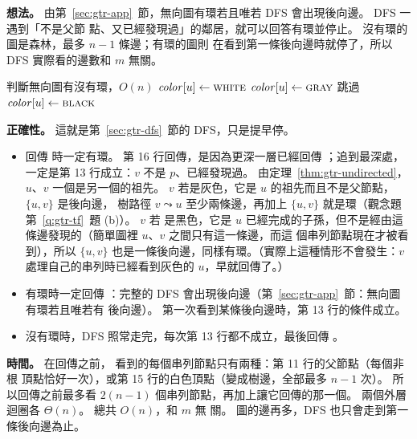 \textbf{想法。} 由第~\ref{sec:gtr-app}~節，無向圖有環若且唯若 DFS 會出現後向邊。 DFS 一遇到「不是父節
點、又已經發現過」的鄰居，就可以回答有環並停止。 沒有環的圖是森林，最多 $n - 1$ 條邊；有環的圖則
在看到第一條後向邊時就停了，所以 DFS 實際看的邊數和 $m$ 無關。

\begin{pseudo}[label=alg:gtr-px-ucycle]{判斷無向圖有沒有環，$O(n)$}
        \State $\mathit{color}[u] \gets \textsc{white}$
    \EndFor
            \State \Return \TRUE
        \EndIf
    \EndFor
    \State \Return \FALSE
\EndFunction
{} 
    \State $\mathit{color}[u] \gets \textsc{gray}$
            \State 跳過 
            \State \Return \TRUE {}
            \State \Return \TRUE
        \EndIf
    \EndFor
    \State $\mathit{color}[u] \gets \textsc{black}$
    \State \Return \FALSE
\EndFunction
\end{pseudo}

\textbf{正確性。} 這就是第~\ref{sec:gtr-dfs}~節的 DFS，只是提早停。
\begin{itemize}
\item 回傳 \TRUE 時一定有環。 第 16 行回傳，是因為更深一層已經回傳 \TRUE；追到最深處，一定是第 13 行成立：$v$ 不是 $p$、已經發現過。 由定理~\ref{thm:gtr-undirected}，
$u$、$v$ 一個是另一個的祖先。 $v$ 若是灰色，它是 $u$ 的祖先而且不是父節點，$\{u, v\}$ 是後向邊，
樹路徑 $v \leadsto u$ 至少兩條邊，再加上 $\{u, v\}$ 就是環（觀念題第~\ref{q:gtr-tf}~題 (b)）。 $v$ 若
是黑色，它是 $u$ 已經完成的子孫，但不是經由這條邊發現的（簡單圖裡 $u$、$v$ 之間只有這一條邊，而這
個串列節點現在才被看到），所以 $\{u, v\}$ 也是一條後向邊，同樣有環。（實際上這種情形不會發生：$v$
處理自己的串列時已經看到灰色的 $u$，早就回傳了。）
\item 有環時一定回傳 \TRUE：完整的 DFS 會出現後向邊（第~\ref{sec:gtr-app}~節：無向圖有環若且唯若有
後向邊）。 第一次看到某條後向邊時，第 13 行的條件成立。
\item 沒有環時，DFS 照常走完，每次第 13 行都不成立，最後回傳 \FALSE。
\end{itemize}

\textbf{時間。} 在回傳之前， 看到的每個串列節點只有兩種：第 11 行的父節點（每個非根
頂點恰好一次），或第 15 行的白色頂點（變成樹邊，全部最多 $n - 1$ 次）。 所以回傳之前最多看
$2(n - 1)$ 個串列節點，再加上讓它回傳的那一個。 兩個外層迴圈各 $\Theta(n)$。 總共 $O(n)$，和 $m$ 無
關。 圖的邊再多，DFS 也只會走到第一條後向邊為止。

